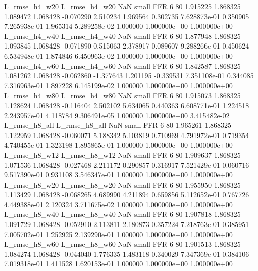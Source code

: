  L_rmse_h4_w20  L_rmse_h4_w20                   NaN      small      FFR                 6 80 1.915225       1.868325 1.089472       1.068428   -0.070290      2.510234      1.969564     0.302735   7.628873e-01  0.350905 7.265938e-01     1.965314   5.289258e-02            1.000000    1.000000e+00        1.000000e+00
 L_rmse_h4_w40  L_rmse_h4_w40                   NaN      small      FFR                 6 80 1.877948       1.868325 1.093845       1.068428   -0.071890      0.515063      2.378917     0.089607   9.288266e-01  0.450624 6.534948e-01     1.874846   6.450963e-02            1.000000    1.000000e+00        1.000000e+00
 L_rmse_h4_w60  L_rmse_h4_w60                   NaN      small      FFR                 6 80 1.842587       1.868325 1.081262       1.068428   -0.062860     -1.377643      1.201195    -0.339531   7.351108e-01  0.344085 7.316963e-01     1.897228   6.145199e-02            1.000000    1.000000e+00        1.000000e+00
 L_rmse_h4_w80  L_rmse_h4_w80                   NaN      small      FFR                 6 80 1.915073       1.868325 1.128624       1.068428   -0.116404      2.502102      5.634065     0.440363   6.608771e-01  1.224518 2.243957e-01     4.118784   9.306491e-05            1.000000    1.000000e+00        3.415482e-02
 L_rmse_h8_all  L_rmse_h8_all                   NaN      small      FFR                 6 80 1.965261       1.868325 1.122959       1.068428   -0.060071      5.188342      5.103819     0.710969   4.791972e-01  0.719354 4.740455e-01     1.323198   1.895865e-01            1.000000    1.000000e+00        1.000000e+00
 L_rmse_h8_w12  L_rmse_h8_w12                   NaN      small      FFR                 6 80 1.909637       1.868325 1.071536       1.068428   -0.027468      2.211172      0.290857     0.316917   7.521429e-01  0.060716 9.517390e-01     0.931108   3.546347e-01            1.000000    1.000000e+00        1.000000e+00
 L_rmse_h8_w20  L_rmse_h8_w20                   NaN      small      FFR                 6 80 1.955950       1.868325 1.113429       1.068428   -0.068265      4.689990      4.211894     0.659856   5.112652e-01  0.767726 4.449388e-01     2.120324   3.711675e-02            1.000000    1.000000e+00        1.000000e+00
 L_rmse_h8_w40  L_rmse_h8_w40                   NaN      small      FFR                 6 80 1.907818       1.868325 1.091729       1.068428   -0.052910      2.113811      2.180873     0.357224   7.218763e-01  0.385951 7.005702e-01     1.252925   2.139290e-01            1.000000    1.000000e+00        1.000000e+00
 L_rmse_h8_w60  L_rmse_h8_w60                   NaN      small      FFR                 6 80 1.901513       1.868325 1.084274       1.068428   -0.044040      1.776335      1.483118     0.340029   7.347369e-01  0.384106 7.019318e-01     1.411528   1.620153e-01            1.000000    1.000000e+00        1.000000e+00
